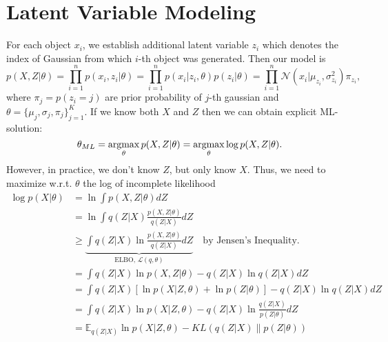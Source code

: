 \section{Latent Variable Modeling}

For each object $x_i$, we establish additional latent variable $z_i$ which denotes the index of Gaussian from which $i$-th object was generated. Then our model is
$$p(X,Z|\theta) = \prod_{i=1}^{n}p(x_i,z_i|\theta) = \prod_{i=1}^{n}p(x_i|z_i,\theta)p(z_i|\theta) = \prod_{i=1}^{n}\mathcal{N}(x_i|\mu_{z_i},\sigma_{z_i}^2)\pi_{z_i},$$
where $\pi_{j} = p(z_i=j)$ are prior probability of $j$-th gaussian and $\theta = \{\mu_j, \sigma_j, \pi_j\}_{j=1}^K$. If we know both $X$ and $Z$ then we can obtain explicit ML-solution:
$$\theta_{ML} = \operatorname*{\operatorname{argmax}}_{\theta}p(X,Z|\theta) = \operatorname*{\operatorname{argmax}}_{\theta}\log p(X,Z|\theta).$$
However, in practice, we don't know $Z$, but only know $X$. Thus, we need to maximize w.r.t. $\theta$ the log of incomplete likelihood
\begin{align}
	\log p(X|\theta) & = \ln \int  p(X, Z|\theta)dZ\\
					 & = \ln\int q(Z|X) \frac{p(X, Z|\theta)}{q(Z|X)}dZ\\
					 & \geq \underbrace{\int q(Z|X) \ln\frac{p(X, Z|\theta)}{q(Z|X)}dZ}_{\text{ELBO, } \mathcal{L}(q,\theta)} \quad\textrm{by Jensen's Inequality.}\\
					 &= \int q(Z|X) \ln p(X, Z|\theta) - q(Z|X)\ln q(Z|X)dZ\\
					 &= \int q(Z|X)[\ln p(X|Z,\theta) + \ln p(Z|\theta)]  - q(Z|X)\ln q(Z|X)dZ\\
					 &= \int q(Z|X)\ln p(X|Z,\theta)  - q(Z|X)\ln\frac{q(Z|X)}{p(Z|\theta)}dZ\\
					 &= \mathbb{E}_{q(Z|X)} \ln p(X|Z,\theta)  - KL\left(q(Z|X)\|p(Z|\theta)\right) 
	\label{eq:elbo}
\end{align}

